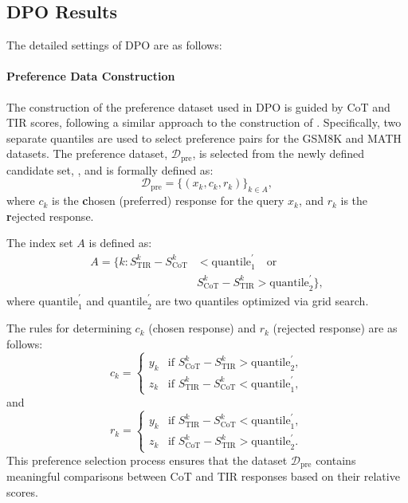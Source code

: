 \subsection{DPO Results}\label{app:rl}

The detailed settings of DPO are as follows:

\paragraph{Preference Data Construction}
The construction of the preference dataset used in DPO is guided by CoT and TIR scores, following a similar approach to the construction of {\dsft}. 
Specifically, two separate quantiles are used to select preference pairs for the GSM8K and MATH datasets.
The preference dataset, $\mathcal{D}_{\text{pre}}$, is selected from the newly defined candidate set, {\dcandidatee}, and is formally defined as:  
$$
\mathcal{D}_{\text{pre}} = \{(x_k, c_k, r_k)\}_{k \in A},
$$  
where $c_k$ is the \textbf{c}hosen (preferred) response for the query $x_k$, and $r_k$ is the \textbf{r}ejected response.  

The index set $A$ is defined as:  
\begin{align*}
    A = \{k: S_{\text{TIR}}^k - S_{\text{CoT}}^k &< \text{quantile}^{'}_1 \quad \text{or} \\ 
    &S_{\text{CoT}}^k - S_{\text{TIR}}^k > \text{quantile}^{'}_2\}, 
\end{align*}  
where $\text{quantile}^{'}_1$ and $\text{quantile}^{'}_2$ are two quantiles optimized via grid search.

The rules for determining $c_k$ (chosen response) and $r_k$ (rejected response) are as follows:  
$$
c_k = 
\begin{cases} 
y_k & \text{if } S_{\text{CoT}}^k - S_{\text{TIR}}^k > \text{quantile}^{'}_2, \\
z_k & \text{if } S_{\text{TIR}}^k - S_{\text{CoT}}^k < \text{quantile}^{'}_1,
\end{cases}
$$
and  
$$
r_k = 
\begin{cases} 
y_k & \text{if } S_{\text{TIR}}^k - S_{\text{CoT}}^k < \text{quantile}^{'}_1, \\
z_k & \text{if } S_{\text{CoT}}^k - S_{\text{TIR}}^k > \text{quantile}^{'}_2.
\end{cases}
$$  
This preference selection process ensures that the dataset $\mathcal{D}_{\text{pre}}$ contains meaningful comparisons between CoT and TIR responses based on their relative scores.



